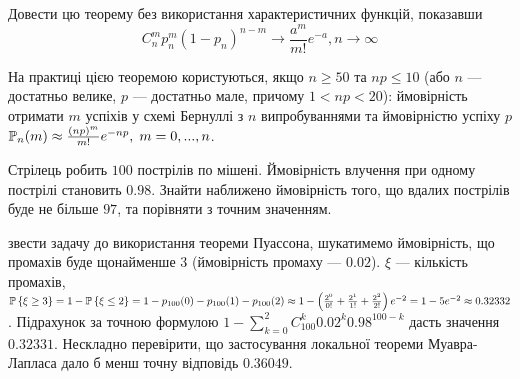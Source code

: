 \begin{exercise}
    Довести цю теорему без використання характеристичних функцій, показавши
    $$C_n^m p_n^m (1-p_n)^{n-m} \to \frac{a^m}{m!}e^{-a}, n\to\infty$$
\end{exercise}
На практиці цією теоремою користуються, якщо $n \geq 50$ та $np \leq 10$ 
(або $n$ --- достатньо велике, $p$ --- достатньо мале, причому $1 < np < 20$):
ймовірність отримати $m$ успіхів у схемі Бернуллі з $n$ випробуваннями та ймовірністю успіху $p$
$\P_n(m) \approx \frac{(np)^m}{m!} e^{-np}, \; m = 0, ..., n$.
\begin{example}
    Стрілець робить $100$ пострілів по мішені. 
    Ймовірність влучення при одному пострілі становить $0.98$. 
    Знайти наближено ймовірність того, що вдалих пострілів буде не більше $97$, та порівняти з точним значенням.
    
     звести задачу до використання теореми Пуассона, шукатимемо ймовірність, що промахів буде щонайменше $3$ (ймовірність
    промаху --- $0.02$). $\xi$ --- кількість промахів,
    $\P\left\{ \xi \geq 3\right\} = 1 - \P\left\{ \xi \leq 2\right\} = 
    1 - p_{100}(0) - p_{100}(1) - p_{100}(2)
    \approx 1 - \left( \frac{2^0}{0!} + \frac{2^1}{1!} + \frac{2^2}{2!}\right)e^{-2} = 1 - 5e^{-2} \approx 0.32332$.
    Підрахунок за точною формулою $1 - \sum\limits_{k=0}^2 C_{100}^k 0.02^k 0.98^{100-k}$ дасть значення $0.32331$. Нескладно
    перевірити, що застосування локальної теореми Муавра-Лапласа дало б менш точну відповідь $0.36049$.
\end{example}